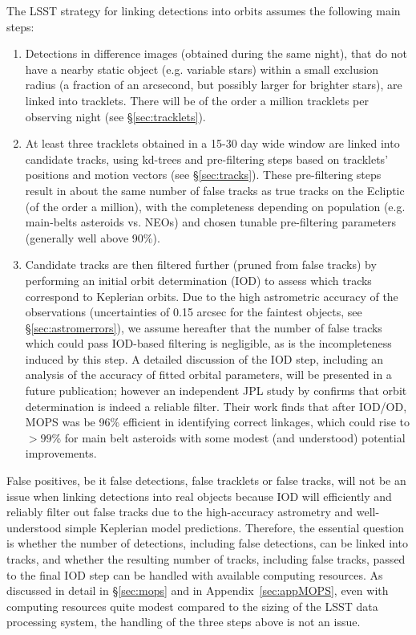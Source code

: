 The LSST strategy for linking detections into orbits assumes the following main steps:
\begin{enumerate}
\item Detections in difference images (obtained during the same night), that do not
         have a nearby static object (e.g. variable stars) within a small exclusion radius
         (a fraction of an arcsecond, but possibly larger for brighter stars), are linked into tracklets. There will be of the order
         a million tracklets per observing night (see \S\ref{sec:tracklets}).
\item At least three tracklets obtained in a 15-30 day wide window are linked into
         candidate tracks, using kd-trees and pre-filtering steps based on tracklets' positions
         and motion vectors (see \S\ref{sec:tracks}). These pre-filtering steps result in
         about the same number of false tracks as true tracks on the Ecliptic (of the order
         a million), with the completeness depending on population (e.g. main-belts
         asteroids vs. NEOs) and chosen tunable pre-filtering parameters (generally well above 90\%).
\item Candidate tracks are then filtered further (pruned from false tracks) by
        performing an initial orbit determination (IOD) to assess which tracks
        correspond to Keplerian orbits.
         Due to the high astrometric accuracy of the observations (uncertainties of 0.15 arcsec for the faintest objects,
         see \S\ref{sec:astromerrors}), we assume 
         hereafter that the number of false tracks which 
         could pass IOD-based filtering is negligible, as is the incompleteness induced by this 
         step. A detailed discussion of the IOD step, 
         including an analysis of the accuracy of fitted orbital parameters,  will be presented in 
         a future publication; however an independent JPL study by \citet{VeresChesley2017mops} 
          confirms that orbit determination is indeed a reliable filter. Their work finds that after IOD/OD, 
          MOPS was be 96\% efficient in identifying correct linkages, which could rise to $>99$\% 
          for main belt asteroids with some modest (and understood) potential improvements.
\end{enumerate}

False positives, be it false detections, false tracklets or false tracks, will not be
an issue when linking detections into real objects because IOD will efficiently and reliably filter 
out false tracks due to the high-accuracy
astrometry and well-understood simple Keplerian model predictions. Therefore, the
essential question is whether the number of detections, including false detections, can be 
linked into tracks, and whether the resulting number of tracks, including false tracks, 
passed to the final IOD step can be handled with available computing resources.
As discussed in detail in \S\ref{sec:mops} and in Appendix~\ref{sec:appMOPS}, 
even with computing resources quite modest compared to the
sizing of the LSST data processing system, the handling of the three steps above is not an issue.
